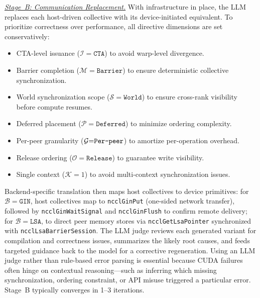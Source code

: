 \noindent\underline{\emph{Stage~B: Communication Replacement.}} With infrastructure in place, the LLM replaces each host-driven collective with its device-initiated equivalent. To prioritize correctness over performance, all directive dimensions are set conservatively:
\begin{itemize}[leftmargin=1.4em,itemsep=1pt,topsep=2pt]
\item CTA-level issuance ($\mathcal{I}{=}\texttt{CTA}$) to avoid warp-level divergence.
\item Barrier completion ($\mathcal{M}{=}\texttt{Barrier}$) to ensure deterministic collective synchronization.
\item World synchronization scope ($\mathcal{S}{=}\texttt{World}$) to ensure cross-rank visibility before compute resumes.
\item Deferred placement ($\mathcal{P}{=}\texttt{Deferred}$) to minimize ordering complexity.
\item Per-peer granularity ($\mathcal{G}{=}\texttt{Per\text{-}peer}$) to amortize per-operation overhead.
\item Release ordering ($\mathcal{O}{=}\texttt{Release}$) to guarantee write visibility.
\item Single context ($\mathcal{K}{=}1$) to avoid multi-context synchronization issues.
\end{itemize}
Backend-specific translation then maps host collectives to device primitives: for $\mathcal{B}{=}\texttt{GIN}$, host collectives map to \texttt{ncclGinPut} (one-sided network transfer), followed by \texttt{ncclGinWaitSignal} and \texttt{ncclGinFlush} to confirm remote delivery; for $\mathcal{B}{=}\texttt{LSA}$, to direct peer memory stores via \texttt{ncclGetLsaPointer} synchronized with \texttt{ncclLsaBarrierSession}. The LLM judge reviews each generated variant for compilation and correctness issues, summarizes the likely root causes, and feeds targeted guidance back to the model for a corrective regeneration. Using an LLM judge rather than rule-based error parsing is essential because CUDA failures often hinge on contextual reasoning---such as inferring which missing synchronization, ordering constraint, or API misuse triggered a particular error. Stage~B typically converges in 1--3 iterations.

